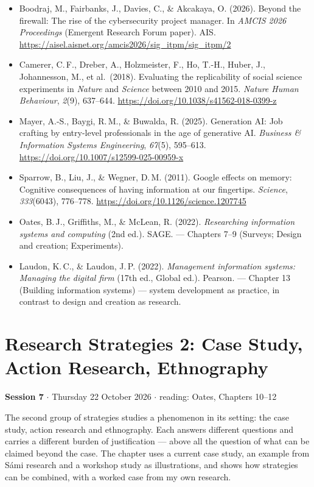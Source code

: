 \documentclass[11pt,a4paper,british,twoside=false,headings=small,chapterprefix=false,numbers=noenddot]{scrbook}
\newcommand{\sessionhead}[2]{\begin{tcolorbox}[enhanced, colback=uiamutedblue, colframe=uiamutedblue, arc=1.5pt, left=6pt, right=6pt]
  \small \textbf{Session #1} \;$\cdot$\; #2\end{tcolorbox}}
\begin{document}
\begin{itemize}
  \item Boodraj, M., Fairbanks, J., Davies, C., \& Akcakaya, O. (2026). Beyond the firewall: The rise of the cybersecurity project manager. In \emph{AMCIS 2026 Proceedings} (Emergent Research Forum paper). AIS. \url{https://aisel.aisnet.org/amcis2026/sig_itpm/sig_itpm/2}
  \item Camerer, C.\,F., Dreber, A., Holzmeister, F., Ho, T.-H., Huber, J., Johannesson, M., et al.\ (2018). Evaluating the replicability of social science experiments in \emph{Nature} and \emph{Science} between 2010 and 2015. \emph{Nature Human Behaviour}, \emph{2}(9), 637--644. \url{https://doi.org/10.1038/s41562-018-0399-z}
  \item Mayer, A.-S., Baygi, R.\,M., \& Buwalda, R. (2025). Generation AI: Job crafting by entry-level professionals in the age of generative AI. \emph{Business \& Information Systems Engineering}, \emph{67}(5), 595--613. \url{https://doi.org/10.1007/s12599-025-00959-x}
  \item Sparrow, B., Liu, J., \& Wegner, D.\,M. (2011). Google effects on memory: Cognitive consequences of having information at our fingertips. \emph{Science}, \emph{333}(6043), 776--778. \url{https://doi.org/10.1126/science.1207745}
  \item Oates, B.\,J., Griffiths, M., \& McLean, R. (2022). \emph{Researching information systems and computing} (2nd ed.). SAGE. --- Chapters 7--9 (Surveys; Design and creation; Experiments).
  \item Laudon, K.\,C., \& Laudon, J.\,P. (2022). \emph{Management information systems: Managing the digital firm} (17th ed., Global ed.). Pearson. --- Chapter 13 (Building information systems) --- system development as practice, in contrast to design and creation as research.
\end{itemize}

\chapter{Research Strategies 2: Case Study, Action Research, Ethnography}
\label{ch:7}
\sessionhead{7}{Thursday 22 October 2026 \;$\cdot$\; reading: Oates, Chapters 10--12}

The second group of strategies studies a phenomenon in its setting: the case study, action research and ethnography. Each answers different questions and carries a different burden of justification --- above all the question of what can be claimed beyond the case. The chapter uses a current case study, an example from S\'ami research and a workshop study as illustrations, and shows how strategies can be combined, with a worked case from my own research.
\end{document}
